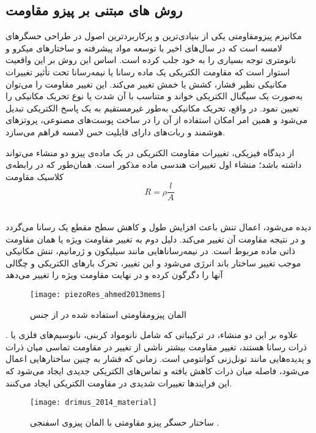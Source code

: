 \subsection{روش های مبتنی بر پیزو مقاومت}
مکانیزم پیزومقاومتی یکی از بنیادی‌ترین و پرکاربردترین اصول در طراحی حسگرهای لامسه است که در سال‌های اخیر با توسعه مواد پیشرفته و ساختارهای میکرو و نانومتری توجه بسیاری را به خود جلب کرده است. اساس این روش بر این واقعیت استوار است که مقاومت الکتریکی یک ماده رسانا یا نیمه‌رسانا تحت تأثیر تغییرات مکانیکی نظیر فشار، کشش یا خمش تغییر می‌کند. این تغییر مقاومت را می‌توان به‌صورت یک سیگنال الکتریکی خواند و متناسب با آن شدت یا نوع تحریک مکانیکی را تعیین نمود. در واقع، تحریک مکانیکی به‌طور غیرمستقیم به یک پاسخ الکتریکی تبدیل می‌شود و همین امر امکان استفاده از آن را در ساخت پوست‌های مصنوعی، پروتزهای هوشمند و ربات‌های دارای قابلیت حس لامسه فراهم می‌سازد.

از دیدگاه فیزیکی، تغییرات مقاومت الکتریکی در یک ماده‌ی پیزو دو منشاء می‌تواند داشته باشد؛ منشاء اول تغییرات هندسی ماده مذکور است. همان‌طور که در رابطه‌ی کلاسیک مقاومت 
\begin{equation}\label{eq:piezoRes1}
	R=\rho\frac{l}{A}
\end{equation}
​

دیده می‌شود، اعمال تنش باعث افزایش طول و کاهش سطح مقطع یک رسانا می‌گردد و در نتیجه مقاومت آن تغییر می‌کند. دلیل دوم به تغییر مقاومت ویژه یا همان مقاومت ذاتی ماده مربوط است. در نیمه‌رساناهایی مانند سیلیکون و ژرمانیم، تنش مکانیکی موجب تغییر ساختار باند انرژی می‌شود و این تغییر، تحرک بارهای الکتریکی و چگالی آنها را دگرگون کرده و در نهایت مقاومت ویژه را تغییر می‌دهد
\begin{figure}[ht]
	\centering
	\texttt{[image: piezoRes\_ahmed2013mems]}
	\caption{المان پیزومقاومتی استفاده شده در
		\cite{ahmed2013piezoRes}
		از جنس
		}
		\label{fig:ahmed_piezores}
	\end{figure}
	. علاوه بر این دو منشاء، در ترکیباتی که شامل نانومواد کربنی، نانوسیم‌های فلزی یا ذرات رسانا هستند، تغییر مقاومت بیشتر ناشی از تغییر در مقاومت تماسی میان ذرات و پدیده‌هایی مانند تونل‌زنی کوانتومی
	است. زمانی که فشار به چنین ساختارهایی اعمال می‌شود، فاصله میان ذرات کاهش یافته و تماس‌های الکتریکی جدیدی ایجاد می‌شود که این فرایندها تغییرات شدیدی در مقاومت الکتریکی ایجاد می‌کنند.
	\cite{xi2024mechanisms}
	\begin{figure}[t]
		\centering
		\texttt{[image: drimus\_2014\_material]}
		\caption{ساختار حسگر پیزو مقاومتی با المان پیزوی اسفنجی
			\cite{drimus2014piezores}.}
		\label{fig:piezoResStructure}
	\end{figure}
	
